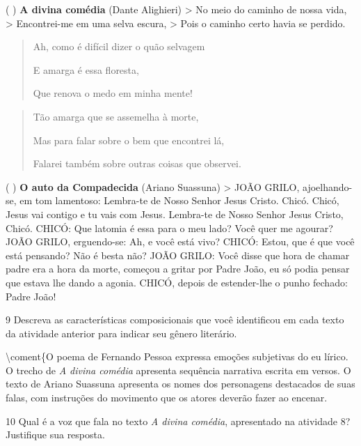 (  ) \textbf{A divina comédia} (Dante Alighieri)
\textgreater{} No meio do caminho de nossa vida, \textgreater{}
Encontrei-me em uma selva escura, \textgreater{} Pois o caminho certo
havia se perdido.

\begin{quote}
Ah, como é difícil dizer o quão selvagem

E amarga é essa floresta,

Que renova o medo em minha mente!
\end{quote}

\begin{quote}
Tão amarga que se assemelha à morte,

Mas para falar sobre o bem que encontrei lá,

Falarei também sobre outras coisas que observei.
\end{quote}

(  ) \textbf{O auto da Compadecida} (Ariano Suassuna)
\textgreater{} JOÃO GRILO, ajoelhando-se, em tom lamentoso: Lembra-te de
Nosso Senhor Jesus Cristo. Chicó. Chicó, Jesus vai contigo e tu vais com
Jesus. Lembra-te de Nosso Senhor Jesus Cristo, Chicó. CHICÓ: Que latomia
é essa para o meu lado? Você quer me agourar? JOÃO GRILO, erguendo-se:
Ah, e você está vivo? CHICÓ: Estou, que é que você está pensando? Não é
besta não? JOÃO GRILO: Você disse que hora de chamar padre era a hora da
morte, começou a gritar por Padre João, eu só podia pensar que estava
lhe dando a agonia. CHICÓ, depois de estender-lhe o punho fechado: Padre
João!

\num{9} Descreva as características composicionais que você identificou
em cada texto da atividade anterior para indicar seu gênero literário.


\textbackslash coment\{O poema de Fernando Pessoa expressa emoções
subjetivas do eu lírico. O trecho de \emph{A divina comédia} apresenta
sequência narrativa escrita em versos. O texto de Ariano Suassuna
apresenta os nomes dos personagens destacados de suas falas, com
instruções do movimento que os atores deverão fazer ao encenar.

\num{10} Qual é a voz que fala no texto \emph{A divina comédia},
apresentado na atividade 8? Justifique sua resposta.



